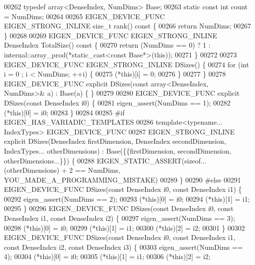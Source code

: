 \begin{DoxyCode}
00262   \textcolor{keyword}{typedef} array<DenseIndex, NumDims> Base;
00263   \textcolor{keyword}{static} \textcolor{keyword}{const} \textcolor{keywordtype}{int} count = NumDims;
00264 
00265   EIGEN\_DEVICE\_FUNC EIGEN\_STRONG\_INLINE \textcolor{keywordtype}{size\_t} rank()\textcolor{keyword}{ const }\{
00266     \textcolor{keywordflow}{return} NumDims;
00267   \}
00268 
00269   EIGEN\_DEVICE\_FUNC EIGEN\_STRONG\_INLINE DenseIndex TotalSize()\textcolor{keyword}{ const }\{
00270     \textcolor{keywordflow}{return} (NumDims == 0) ? 1 : internal::array\_prod(*static\_cast<const Base*>(\textcolor{keyword}{this}));
00271   \}
00272 
00273   EIGEN\_DEVICE\_FUNC EIGEN\_STRONG\_INLINE DSizes() \{
00274     \textcolor{keywordflow}{for} (\textcolor{keywordtype}{int} i = 0 ; i < NumDims; ++i) \{
00275       (*this)[i] = 0;
00276     \}
00277   \}
00278   EIGEN\_DEVICE\_FUNC \textcolor{keyword}{explicit} DSizes(\textcolor{keyword}{const} array<DenseIndex, NumDims>& a) : Base(a) \{ \}
00279 
00280   EIGEN\_DEVICE\_FUNC \textcolor{keyword}{explicit} DSizes(\textcolor{keyword}{const} DenseIndex i0) \{
00281     eigen\_assert(NumDims == 1);
00282     (*this)[0] = i0;
00283   \}
00284 
00285 \textcolor{preprocessor}{#if EIGEN\_HAS\_VARIADIC\_TEMPLATES}
00286   \textcolor{keyword}{template}<\textcolor{keyword}{typename}... IndexTypes> EIGEN\_DEVICE\_FUNC
00287   EIGEN\_STRONG\_INLINE \textcolor{keyword}{explicit} DSizes(DenseIndex firstDimension, DenseIndex secondDimension, IndexTypes... 
      otherDimensions) : Base(\{\{firstDimension, secondDimension, otherDimensions...\}\}) \{
00288     EIGEN\_STATIC\_ASSERT(\textcolor{keyword}{sizeof}...(otherDimensions) + 2 == NumDims, YOU\_MADE\_A\_PROGRAMMING\_MISTAKE)
00289   \}
00290 \textcolor{preprocessor}{#else}
00291   EIGEN\_DEVICE\_FUNC DSizes(\textcolor{keyword}{const} DenseIndex i0, \textcolor{keyword}{const} DenseIndex i1) \{
00292     eigen\_assert(NumDims == 2);
00293     (*this)[0] = i0;
00294     (*this)[1] = i1;
00295   \}
00296   EIGEN\_DEVICE\_FUNC DSizes(\textcolor{keyword}{const} DenseIndex i0, \textcolor{keyword}{const} DenseIndex i1, \textcolor{keyword}{const} DenseIndex i2) \{
00297     eigen\_assert(NumDims == 3);
00298     (*this)[0] = i0;
00299     (*this)[1] = i1;
00300     (*this)[2] = i2;
00301   \}
00302   EIGEN\_DEVICE\_FUNC DSizes(\textcolor{keyword}{const} DenseIndex i0, \textcolor{keyword}{const} DenseIndex i1, \textcolor{keyword}{const} DenseIndex i2, \textcolor{keyword}{const} DenseIndex 
      i3) \{
00303     eigen\_assert(NumDims == 4);
00304     (*this)[0] = i0;
00305     (*this)[1] = i1;
00306     (*this)[2] = i2;

\end{DoxyCode}
